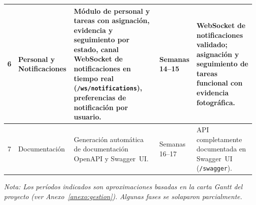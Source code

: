 \begin{longtable}{|c|p{}|p{}|p{}|p{}|}
6 & Personal y Notificaciones &
Módulo de personal y tareas con asignación, evidencia y seguimiento por estado, canal WebSocket de notificaciones en tiempo real (\texttt{/ws/notifications}), preferencias de notificación por usuario. &
Semanas 14--15 &
WebSocket de notificaciones validado; asignación y seguimiento de tareas funcional con evidencia fotográfica. \\
\hline

7 & Documentación &
Generación automática de documentación OpenAPI y Swagger~UI. &
Semanas 16--17 &
API completamente documentada en Swagger~UI (\texttt{/swagger}). \\

\end{longtable}

\textit{Nota: Los períodos indicados son aproximaciones basadas en la carta Gantt del proyecto (ver Anexo~\ref{anexo:gestion}). Algunas fases se solaparon parcialmente.}

